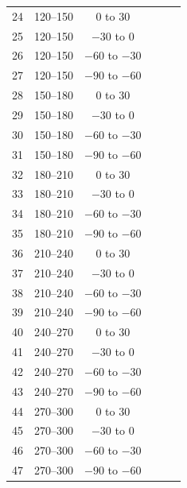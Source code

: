 \begin{longtable}{c c c p{2cm} p{2cm} p{3cm}}
24 & 120--150 & $0$ to $30$    & & & \\
25 & 120--150 & $-30$ to $0$   & & & \\
26 & 120--150 & $-60$ to $-30$ & & & \\
27 & 120--150 & $-90$ to $-60$ & & & \\
28 & 150--180 & $0$ to $30$    & & & \\
29 & 150--180 & $-30$ to $0$   & & & \\
30 & 150--180 & $-60$ to $-30$ & & & \\
31 & 150--180 & $-90$ to $-60$ & & & \\
32 & 180--210 & $0$ to $30$    & & & \\
33 & 180--210 & $-30$ to $0$   & & & \\
34 & 180--210 & $-60$ to $-30$ & & & \\
35 & 180--210 & $-90$ to $-60$ & & & \\
36 & 210--240 & $0$ to $30$    & & & \\
37 & 210--240 & $-30$ to $0$   & & & \\
38 & 210--240 & $-60$ to $-30$ & & & \\
39 & 210--240 & $-90$ to $-60$ & & & \\
40 & 240--270 & $0$ to $30$    & & & \\
41 & 240--270 & $-30$ to $0$   & & & \\
42 & 240--270 & $-60$ to $-30$ & & & \\
43 & 240--270 & $-90$ to $-60$ & & & \\
44 & 270--300 & $0$ to $30$    & & & \\
45 & 270--300 & $-30$ to $0$   & & & \\
46 & 270--300 & $-60$ to $-30$ & & & \\
47 & 270--300 & $-90$ to $-60$ & & & \\
\end{longtable}